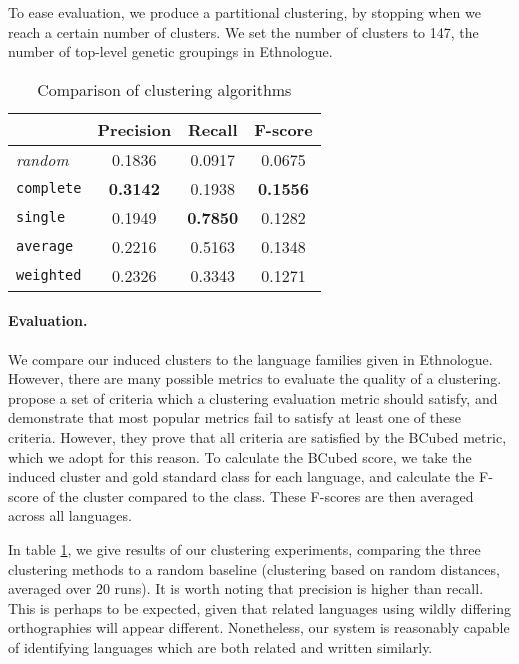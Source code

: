 To ease evaluation, we produce a partitional clustering, by stopping when we reach a certain number of clusters. We set the number of clusters to 147, the number of top-level genetic groupings in Ethnologue.

\begin{table}[t]
\begin{centering}

    \begin{tabular}{l|ccc}
    ~        & Precision & Recall       & F-score    \\ \hline
	\emph{random} & 0.1836	& 0.0917	& 0.0675 \\ \hline
	\texttt{complete} & \textbf{0.3142}	& 0.1938	 & \textbf{0.1556} \\
	\texttt{single} & 0.1949	& \textbf{0.7850}	 & 0.1282 \\
	\texttt{average} & 0.2216	& 0.5163	& 0.1348 \\
	\texttt{weighted} & 0.2326	& 0.3343	& 0.1271 \\
    \end{tabular}
\caption{Comparison of clustering algorithms}
\label{table:cluster}
\end{centering}
\end{table}

\paragraph{Evaluation.}
We compare our induced clusters to the language families given in Ethnologue. However, there are many possible metrics to evaluate the quality of a clustering.  propose a set of criteria which a clustering evaluation metric should satisfy, and demonstrate that most popular metrics fail to satisfy at least one of these criteria.  However, they prove that all criteria are satisfied by the BCubed metric, which we adopt for this reason.  To calculate the BCubed score, we take the induced cluster and gold standard class for each language, and calculate the F-score of the cluster compared to the class.  These F-scores are then averaged across all languages.

In table \ref{table:cluster}, we give results of our clustering experiments, comparing the three clustering methods to a random baseline (clustering based on random distances, averaged over 20 runs).  It is worth noting that precision is higher than recall.  This is perhaps to be expected, given that related languages using wildly differing orthographies will appear different.  Nonetheless, our system is reasonably capable of identifying languages which are both related and written similarly.

